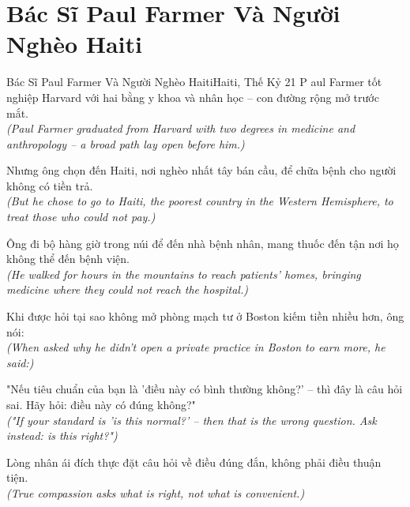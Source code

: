 \section{Bác Sĩ Paul Farmer Và Người Nghèo Haiti}
\begin{truyen}{Bác Sĩ Paul Farmer Và Người Nghèo Haiti}{Haiti, Thế Kỷ 21}
P aul Farmer tốt nghiệp Harvard với hai bằng y khoa và nhân học -- con đường rộng mở trước mắt.\\
\textit{(Paul Farmer graduated from Harvard with two degrees in medicine and anthropology -- a broad path lay open before him.)}

Nhưng ông chọn đến Haiti, nơi nghèo nhất tây bán cầu, để chữa bệnh cho người không có tiền trả.\\
\textit{(But he chose to go to Haiti, the poorest country in the Western Hemisphere, to treat those who could not pay.)}

Ông đi bộ hàng giờ trong núi để đến nhà bệnh nhân, mang thuốc đến tận nơi họ không thể đến bệnh viện.\\
\textit{(He walked for hours in the mountains to reach patients' homes, bringing medicine where they could not reach the hospital.)}

Khi được hỏi tại sao không mở phòng mạch tư ở Boston kiếm tiền nhiều hơn, ông nói:\\
\textit{(When asked why he didn't open a private practice in Boston to earn more, he said:)}

"Nếu tiêu chuẩn của bạn là 'điều này có bình thường không?' -- thì đây là câu hỏi sai. Hãy hỏi: điều này có đúng không?"\\
\textit{("If your standard is 'is this normal?' -- then that is the wrong question. Ask instead: is this right?")}

\end{truyen}
\begin{baihoc}
  Lòng nhân ái đích thực đặt câu hỏi về điều đúng đắn, không phải điều thuận tiện.\\
  \textit{(True compassion asks what is right, not what is convenient.)}
\end{baihoc}

